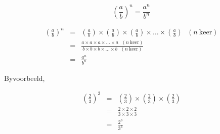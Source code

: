 

{
$$ \left(\frac{a}{b}\right)^n = \frac{a^n}{b^n} $$

\begin{eqnarray*}

 \left(\frac{a}{b}\right)^n & = & \left(\frac{a}{b}\right) \times \left(\frac{a}{b}\right) \times \left(\frac{a}{b}\right) \times \ldots \times \left(\frac{a}{b}\right) ~~~(n~\mbox{keer}) \\
                         & = & \frac{a \times a \times a \times \ldots \times a ~~~(n~\mbox{keer})}{b \times b \times b \times \ldots \times b ~~~(n~\mbox{keer})}\\
                         & = & \frac{a^n}{b^n}
\end{eqnarray*}



}




Byvoorbeeld,

\begin{eqnarray*}

\left(\frac{2}{3}\right)^3 & = & \left(\frac{2}{3}\right) \times  \left(\frac{2}{3}\right) \times \left(\frac{2}{3}\right) \\
                        & = & \frac{2 \times 2 \times 2}{3 \times 3 \times 3} \\
		        & = & \frac{2^3}{3^3}




\end{eqnarray*}







            

